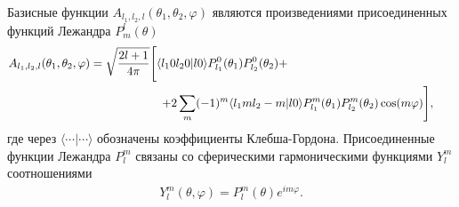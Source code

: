 Базисные функции $A_{l_1, l_2, l}(\theta_1, \theta_2, \varphi)$ являются произведениями присоединенных функций Лежандра $P^l_m(\theta)$
\begin{gather}
    A_{l_1, l_2, l}(\theta_1, \theta_2, \varphi) = \sqrt{\frac{2l+1}{4 \pi}} \Bigg[ \langle l_1 0 l_2 0 \vert l 0 \rangle P_{l_1}^0(\theta_1) P_{l_2}^0(\theta_2) + \hspace{5cm} \notag \\
    \hspace{4cm} + 2 \sum_{m} (-1)^m \langle l_1 m l_2 -m \vert l 0 \rangle P_{l_1}^m(\theta_1) P_{l_2}^m(\theta_2) \cos(m \varphi) \Bigg], 
\end{gather}
%
где через $\langle \cdots \vert \cdots \rangle$ обозначены коэффициенты Клебша-Гордона. Присоединенные функции Лежандра $P_l^m$ связаны со сферическими гармоническими функциями $Y_l^m$ соотношениями
\begin{gather}
    Y_l^m(\theta, \varphi) = P_l^m(\theta) e^{i m \varphi}.
\end{gather}


